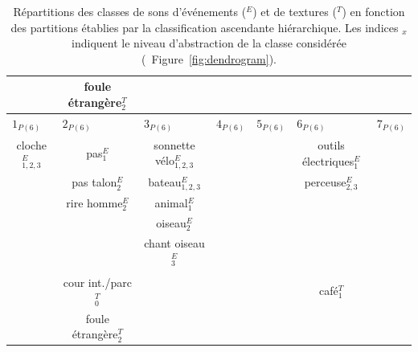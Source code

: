 \begin{table}[t]
\begin{tabular}{c|c|c|c|c|c|c}
                         &  foule étrangère$_2^T$  &                    & \multicolumn{2}{c|}{} &                     &  \\               
\hline
\multicolumn{1}{l|}{$1_{P(6)}$} & \multicolumn{1}{l|}{$2_{P(6)}$} & \multicolumn{1}{l|}{$3_{P(6)}$}  & \multicolumn{1}{l|}{$4_{P(6)}$} & \multicolumn{1}{l|}{$5_{P(6)}$} & \multicolumn{1}{l|}{$6_{P(6)}$} & \multicolumn{1}{l}{$7_{P(6)}$} \\  
cloche$_{1,2,3}^E$       & pas$_{1}^E$             & sonnette vélo$_{1,2,3}^E$ &     &     & outils électriques$_1^E$ &   \\        
                         & pas talon$_{2}^E$       & bateau$_{1,2,3}^E$        &     &     & perceuse$_{2,3}^E$     &  \\  
                         & rire homme$_{2}^E$      & animal$_{1}^E$            &     &     &                        & \\  
                         &                         & oiseau$_2^E$              &     &     &                        & \\  
                         &                         & chant oiseau$_3^E$        &     &     &                        & \\  
                         &                         &                           &     &     &                        & \\                            
                         & cour int./parc$_0^T$    &                           &     &     & café$_1^T$             & \\   
                         & foule étrangère$_2^T$   &                           &     &     &                        & \\     
\hline

\end{tabular}
\vspace{0.5mm}
\caption[Répartition des classes de sons en fonction des partitions établies par la classification ascendante hiérarchique.]{Répartitions des classes de sons d'événements ($^E$) et de textures ($^T$) en fonction des partitions établies par la classification ascendante hiérarchique. Les indices $_{x}$ indiquent le niveau d'abstraction de la classe considérée (\cf~Figure~\ref{fig:dendrogram}).}
\label{tab:markerHacClass}
\end{table}
